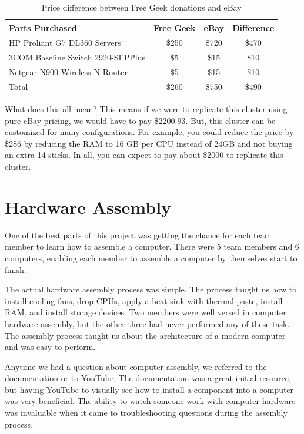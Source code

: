 \documentclass[12pt]{article}
\begin{document}
\begin{table}[ht!]
    \centering
    \begin{tabular}{lccc}
        Parts Purchased & Free Geek & eBay  & Difference\\
        \hline
        HP Proliant G7 DL360 Servers & \$250 & \$720 & \$470\\
        3COM Baseline Switch 2920-SFPPlus & \$5 & \$15 & \$10\\
        Netgear N900 Wireless N Router & \$5 & \$15 & \$10\\
        \hline
        Total & \$260 & \$750 & \$490\\
    \end{tabular}
    \caption{Price difference between Free Geek donations and eBay}
    \label{tab:freegeekdif}
\end{table}

What does this all mean? This means if we were to replicate this cluster using pure eBay pricing, we would have to pay \$2200.93. But, this cluster can be customized for many configurations. For example, you could reduce the price by \$286 by reducing the RAM to 16 GB per CPU instead of 24GB and not buying an extra 14 sticks. In all, you can expect to pay about \$2000 to replicate this cluster.

\section{Hardware Assembly}

One of the best parts of this project was getting the chance for each team member to learn how to assemble a computer. There were 5 team members and 6 computers, enabling each member to assemble a computer by themselves start to finish.

The actual hardware assembly process was simple. The process taught us how to install cooling fans, drop CPUs, apply a heat sink with thermal paste, install RAM, and install storage devices. Two members were well versed in computer hardware assembly, but the other three had never performed any of these task. The assembly process taught us about the architecture of a modern computer and was easy to perform.

Anytime we had a question about computer assembly, we referred to the documentation or to YouTube. The documentation was a great initial resource, but having YouTube \cite{YouTube} to visually see how to install a component into a computer was very beneficial. The ability to watch someone work with computer hardware was invaluable when it came to troubleshooting questions during the assembly process.
\end{document}
